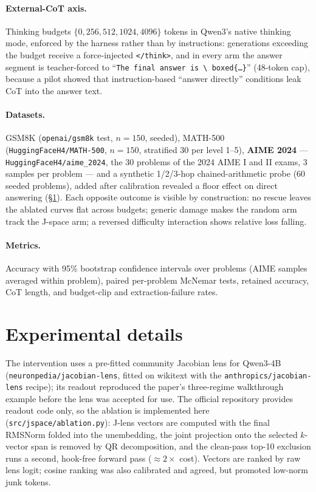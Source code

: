 \documentclass[9pt,twocolumn]{extarticle}
\begin{document}
\paragraph{External-CoT axis.} Thinking budgets $\{0, 256, 512, 1024,
4096\}$ tokens in Qwen3's native thinking mode, enforced by the harness
rather than by instructions: generations exceeding the budget receive a
force-injected \texttt{</think>}, and in every arm the answer segment is
teacher-forced to ``\texttt{The final answer is \textbackslash
boxed\{\dots\}}'' (48-token cap), because a pilot showed that
instruction-based ``answer directly'' conditions leak CoT into the answer
text.

\paragraph{Datasets.} GSM8K (\texttt{openai/gsm8k} test, $n = 150$,
seeded), MATH-500 (\texttt{HuggingFaceH4/MATH-500}, $n = 150$, stratified
30 per level 1--5), \textbf{AIME 2024} --- \texttt{HuggingFaceH4/aime\_2024},
the 30 problems of the 2024 AIME I and II exams, 3 samples per problem ---
and a synthetic 1/2/3-hop chained-arithmetic probe (60 seeded problems),
added after calibration revealed a floor effect on direct answering
(\S\ref{sec:details}). Each opposite outcome is visible by construction: no
rescue leaves the ablated curves flat across budgets; generic damage makes
the random arm track the J-space arm; a reversed difficulty interaction
shows relative loss falling.

\paragraph{Metrics.} Accuracy with 95\% bootstrap confidence intervals over
problems (AIME samples averaged within problem), paired per-problem
McNemar tests,
retained accuracy, CoT length, and budget-clip and extraction-failure
rates.

\section{Experimental details}\label{sec:details}

The intervention uses a pre-fitted community Jacobian lens for Qwen3-4B
(\texttt{neuronpedia/jacobian-lens}, fitted on wikitext with the
\texttt{anthropics/jacobian-lens} recipe); its readout reproduced the
paper's three-regime walkthrough example before the lens was accepted
for use. The official
repository provides readout code only, so the ablation is implemented here
(\texttt{src/jspace/ablation.py}): J-lens vectors are computed with the
final RMSNorm folded into the unembedding, the joint projection onto the
selected $k$-vector span is removed by QR decomposition, and the clean-pass
top-10 exclusion runs a second, hook-free forward pass ($\approx 2\times$
cost). Vectors are ranked by raw lens logit; cosine ranking was also
calibrated and agreed, but promoted low-norm junk tokens.
\end{document}
